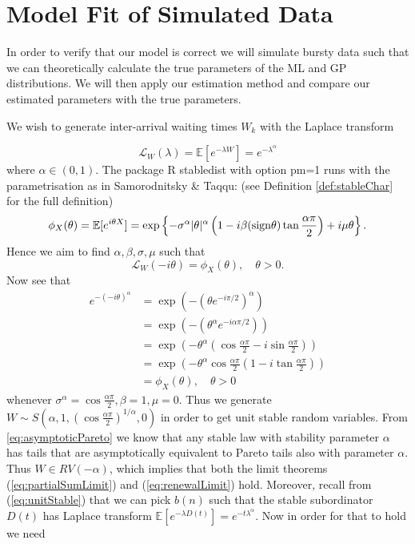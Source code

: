 \documentclass[honours,12pt]{unswthesis}
\newcommand{\E}{\mathbb{E}}
\newcommand{\1}{\mathbf 1}
\numberwithin{equation}{section}
\theoremstyle{definition}
\theoremstyle{remark}
\begin{document}
\section{Model Fit of Simulated Data}
In order to verify that our model is correct we will simulate bursty data such that we can theoretically calculate the true parameters of the ML and GP distributions. We will then apply our estimation method and compare our estimated parameters with the true parameters.

We wish to generate inter-arrival waiting times $W_k$ with the Laplace transform

$$\mathcal L_W(\lambda) = \E [e^{-\lambda W}] = e^{-\lambda^\alpha}$$ 
where $\alpha \in (0,1)$. 
The package R stabledist with option pm=1 runs with the parametrisation
as in Samorodnitsky \& Taqqu: (see Definition \ref{def:stableChar} for the full definition)
\begin{align*}
\phi_X (\theta) = \E[ e^{i\theta X}] = \exp \left\lbrace -\sigma^\alpha |\theta|^\alpha \left(1 - i\beta({\rm sign} \theta) \tan \frac{\alpha \pi}{2}\right) + i \mu \theta \right\rbrace.
\end{align*}
Hence we aim to find $\alpha, \beta, \sigma, \mu$ such that 
$$\mathcal L_W(-i\theta) = \phi_X(\theta), \quad \theta > 0.$$
Now see that 
\begin{align*}
e^{-(-i\theta)^\alpha}
&= \exp\left(-(\theta e^{-i \pi / 2})^\alpha\right)\\
&= \exp\left(-\left(\theta^\alpha e^{-i\alpha \pi/2}\right)\right)\\
&= \exp\left(-\theta^\alpha\left(\cos \frac{\alpha\pi}{2} - i \sin\frac{\alpha\pi}{2}\right)\right)
\\
&= \exp\left(-\theta^\alpha \cos\frac{\alpha\pi}{2}\left(1 - i \tan \frac{\alpha\pi}{2}\right)\right)\\
&=  \phi_X(\theta), \quad \theta > 0
\end{align*}
whenever $\sigma^\alpha = \cos\frac{\alpha\pi}{2}, \beta = 1, \mu = 0$. Thus we generate $W\sim S(\alpha,1,(\cos\frac{\alpha\pi}{2})^{1/\alpha},0)$ in order to get unit stable random variables. From \ref{eq:asymptoticPareto} we know that any stable law with stability parameter $\alpha$ has tails that are asymptotically equivalent to Pareto tails also with parameter $\alpha$. Thus $W\in RV(-\alpha)$, which implies that both the limit theorems (\ref{eq:partialSumLimit}) and (\ref{eq:renewalLimit}) hold. Moreover, recall from (\ref{eq:unitStable}) that we can pick $b(n)$ such that the stable subordinator $D(t)$ has Laplace transform $\E[e^{-\lambda D(t)}] = e^{-t \lambda^\alpha}$. Now in order for that to hold we need 
\end{document}
